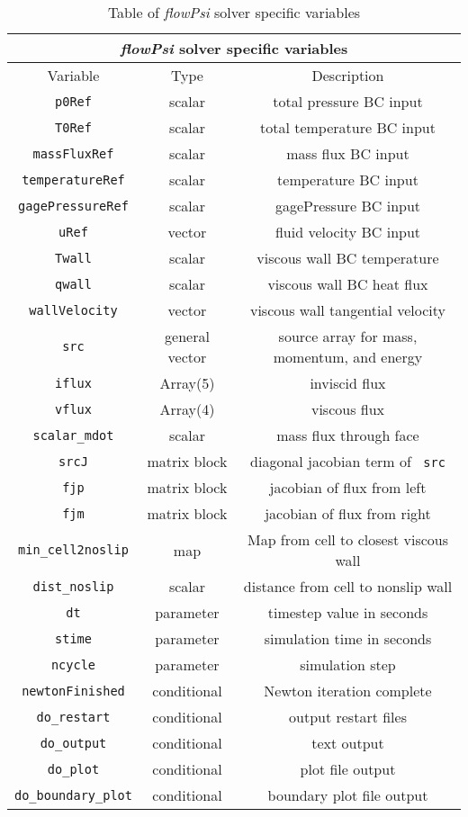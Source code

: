 \documentclass[letterpaper,twoside]{article}
\begin{document}
\begin{table}
\caption{Table of {\it flowPsi} solver specific variables}
\label{tab:flowPsiSolver}
\begin{center}
\begin{tabular}{|c|c|c|}
\hline
\multicolumn{3}{|c|}{ {\it flowPsi} solver specific variables}\\
\hline
Variable & Type & Description\\
\hline\hline
{\tt p0Ref} & scalar & total pressure BC input\\
{\tt T0Ref} & scalar & total temperature BC input\\
{\tt massFluxRef}& scalar & mass flux BC input\\
{\tt temperatureRef} & scalar& temperature BC input\\
{\tt gagePressureRef} & scalar & gagePressure BC input\\
{\tt uRef} & vector & fluid velocity BC input\\
{\tt Twall} & scalar & viscous wall BC temperature\\
{\tt qwall} & scalar & viscous wall BC heat flux\\
{\tt wallVelocity} & vector & viscous wall tangential velocity\\
{\tt src} & general vector & source array for mass, momentum, and
energy\\
{\tt iflux} & Array(5) & inviscid flux\\
{\tt vflux} &  Array(4) & viscous flux\\
{\tt scalar\_mdot} & scalar & mass flux through face\\
{\tt srcJ} & matrix block & diagonal jacobian term of {\tt
  src}\\
{\tt fjp} & matrix block & jacobian of flux from left\\
{\tt fjm} & matrix block & jacobian of flux from right\\ 
{\tt min\_cell2noslip} & map & Map from cell to closest viscous wall\\
{\tt dist\_noslip} & scalar & distance from cell to nonslip wall\\
{\tt dt} & parameter & timestep value in seconds\\
{\tt stime} & parameter& simulation time in seconds\\
{\tt ncycle} & parameter & simulation step \\
{\tt newtonFinished} & conditional & Newton iteration complete\\
{\tt do\_restart} & conditional & output restart files\\
{\tt do\_output} & conditional & text output\\
{\tt do\_plot} & conditional & plot file output\\
{\tt do\_boundary\_plot} & conditional & boundary plot file output\\
\hline
\end{tabular}
\end{center}
\end{table}
\end{document}
